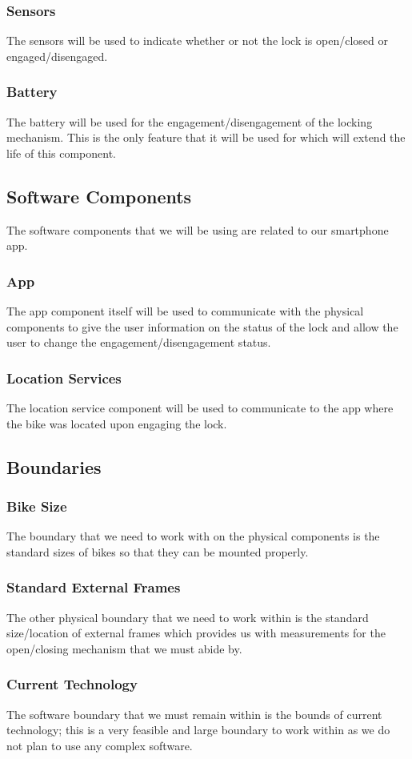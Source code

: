 \documentclass{article}
\begin{document}
\subsubsection{Sensors}
The sensors will be used to indicate whether or not the lock is open/closed or engaged/disengaged. 
\subsubsection{Battery}
The battery will be used for the engagement/disengagement of the locking mechanism.  This is the only feature that it will be used for which will extend the life of this component.
\subsection {Software Components}
The software components that we will be using are related to our smartphone app.
\subsubsection {App}
The app component itself will be used to communicate with the physical components to give the user information on the status of the lock and allow the user to change the engagement/disengagement status. 
\subsubsection {Location Services}
The location service component will be used to communicate to the app where the bike was located upon engaging the lock.
\subsection {Boundaries}
\subsubsection{Bike Size}
The boundary that we need to work with on the physical components is the standard sizes of bikes so that they can be mounted properly.
\subsubsection{Standard External Frames}
The other physical boundary that we need to work within is the standard size/location of external frames which provides us with measurements for the open/closing mechanism that we must abide by.
\subsubsection{Current Technology}
The software boundary that we must remain within is the bounds of current technology; this is a very feasible and large boundary to work within as we do not plan to use any complex software.
\end{document}
